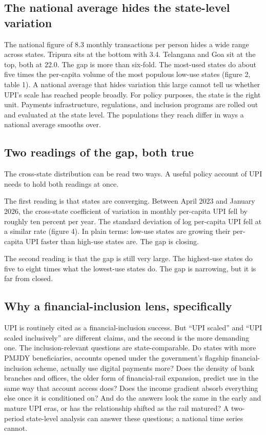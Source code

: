 \documentclass[
]{article}
\begin{document}
\subsection{The national average hides the state-level
variation}\label{the-national-average-hides-the-state-level-variation}

The national figure of 8.3 monthly transactions per person hides a wide
range across states. Tripura sits at the bottom with 3.4. Telangana and
Goa sit at the top, both at 22.0. The gap is more than six-fold. The
most-used states do about five times the per-capita volume of the most
populous low-use states (figure 2, table 1). A national average that
hides variation this large cannot tell us whether UPI's scale has
reached people broadly. For policy purposes, the state is the right
unit. Payments infrastructure, regulations, and inclusion programs are
rolled out and evaluated at the state level. The populations they reach
differ in ways a national average smooths over.

\subsection{Two readings of the gap, both
true}\label{two-readings-of-the-gap-both-true}

The cross-state distribution can be read two ways. A useful policy
account of UPI needs to hold both readings at once.

The first reading is that states are converging. Between April 2023 and
January 2026, the cross-state coefficient of variation in monthly
per-capita UPI fell by roughly ten percent per year. The standard
deviation of log per-capita UPI fell at a similar rate (figure 4). In
plain terms: low-use states are growing their per-capita UPI faster than
high-use states are. The gap is closing.

The second reading is that the gap is still very large. The highest-use
states do five to eight times what the lowest-use states do. The gap is
narrowing, but it is far from closed.

\subsection{Why a financial-inclusion lens,
specifically}\label{why-a-financial-inclusion-lens-specifically}

UPI is routinely cited as a financial-inclusion success. But ``UPI
scaled'' and ``UPI scaled inclusively'' are different claims, and the
second is the more demanding one. The inclusion-relevant questions are
state-comparable. Do states with more PMJDY beneficiaries, accounts
opened under the government's flagship financial-inclusion scheme,
actually use digital payments more? Does the density of bank branches
and offices, the older form of financial-rail expansion, predict use in
the same way that account access does? Does the income gradient absorb
everything else once it is conditioned on? And do the answers look the
same in the early and mature UPI eras, or has the relationship shifted
as the rail matured? A two-period state-level analysis can answer these
questions; a national time series cannot.
\end{document}
